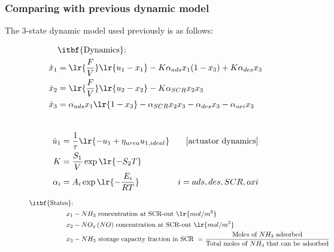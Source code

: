\newpage
\subsubsection{Comparing with previous dynamic model }
The 3-state dynamic model used previously \cite{jain2023diagnostics} is as follows:
\begin{figure}[H]
    \begin{minipage}{0.59\textwidth}
        \begin{align*}
        &\text{\itbf{Dynamics}:}\\
            \dot x_1 &= \lr{\frac{F}{V}} \lr{u_1 - x_1} - K \alpha_{ads} x_1 (1 - x_3) + K \alpha_{des} x_3\\
            \dot x_2 &= \lr{\frac{F}{V}} \lr{u_2 - x_2} - K \alpha_{SCR} x_2 x_3\\
            \dot x_3 &= \alpha_{ads} x_1 \lr{ 1 - x_3} - \alpha_{SCR} x_2 x_3 - \alpha_{des} x_3 - \alpha_{oxi} x_3
        \end{align*}
    \end{minipage}
    \begin{minipage}{0.4\textwidth}
        \begin{align*}
            &\\
            \dot u_1 &= \frac{1}{\tau} \lr{ -u_1 +\eta_{urea} u_{1, ideal}} & [\text{actuator dynamics}]\\
            K &= \frac{S_1}{V} \exp\lr{-S_2 T}\\
            \alpha_i &= A_i \exp\lr{-\frac{E_i}{RT}}
            & i = ads, des, SCR, oxi
        \end{align*}
    \end{minipage}
    \begin{minipage}{\textwidth}
        \begin{align*}
            \text{\itbf{States}:}&\\
            x_1 &- NH_3 \text{ concentration at SCR-out } \lr{mol/m^3}\\
            x_2 &- NO_x \, (NO) \text{ concentration at SCR-out } \lr{mol/m^3}\\
            x_3 &- NH_3 \text{ storage capacity fraction in SCR } = \frac{\text{Moles of $NH_3$ adsorbed}}{\text{Total moles of $NH_3$ that can be adsorbed}}\\

\end{align*}
\end{minipage}
\end{figure}
